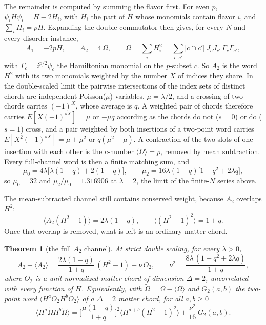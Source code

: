 \documentclass[11pt]{article}
\newtheorem{theorem}{Theorem}
\begin{document}
The remainder is computed by summing the flavor first. For even $p$,
$\psi_iH\psi_i=H-2H_i$, with $H_i$ the part of $H$ whose monomials
contain flavor $i$, and $\sum_iH_i=pH$. Expanding the double commutator
then gives, for every $N$ and every disorder instance,
\begin{equation}
A_1=-2pH,\qquad A_2=4\,\Omega,\qquad \Omega=\sum_iH_i^2
=\sum_{c,c'}|c\cap c'|\,J_cJ_{c'}\,\Gamma_c\Gamma_{c'},
\label{eq:A2}
\end{equation}
with $\Gamma_c=i^{p/2}\psi_{c}$ the Hamiltonian monomial on the $p$-subset
$c$. So $A_2$ is the word $H^2$ with its two monomials weighted by the
number $X$ of indices they share. In the double-scaled limit the
pairwise intersections of the index sets of distinct chords are
independent Poisson($\mu$) variables, $\mu=\lambda/2$, and a crossing of
two chords carries $(-1)^X$, whose average is $q$. A weighted pair of
chords therefore carries $E[X(-1)^{sX}]=\mu$ or $-\mu q$ according as
the chords do not ($s=0$) or do ($s=1$) cross, and a pair weighted by
both insertions of a two-point word carries $E[X^2(-1)^{sX}]=\mu+\mu^2$
or $q(\mu^2-\mu)$. A contraction of the two slots of one insertion with
each other is the $c$-number $\langle\Omega\rangle=p$, removed by mean
subtraction. Every full-channel word is then a finite matching sum, and
\begin{equation}
\mu_0=4\lambda\big[\lambda(1+q)+2(1-q)\big],\qquad
\mu_2=16\lambda(1-q)\big[1-q^2+2\lambda q\big],
\end{equation}
so $\mu_0=32$ and $\mu_2/\mu_0=1.316906$ at $\lambda=2$, the limit of
the finite-$N$ series above.

The mean-subtracted channel still contains conserved weight, because
$A_2$ overlaps $H^2$:
\begin{equation}
\langle A_2(H^2-1)\rangle=2\lambda(1-q),\qquad
\langle(H^2-1)^2\rangle=1+q .
\end{equation}
Once that overlap is removed, what is left is an ordinary matter chord.

\begin{theorem}[the full $A_2$ channel]
At strict double scaling, for every $\lambda>0$,
\begin{equation}
A_2-\langle A_2\rangle=\frac{2\lambda(1-q)}{1+q}\,(H^2-1)+\nu\,O_2,
\qquad
\nu^2=\frac{8\lambda\,(1-q^2+2\lambda q)}{1+q},
\label{eq:split}
\end{equation}
where $O_2$ is a unit-normalized matter chord of dimension $\Delta=2$,
uncorrelated with every function of $H$. Equivalently, with
$\tilde\Omega=\Omega-\langle\Omega\rangle$ and $G_2(a,b)$ the two-point
word $\langle H^aO_2H^bO_2\rangle$ of a $\Delta=2$ matter chord, for all
$a,b\ge0$
\begin{equation}
\langle H^a\tilde\Omega H^b\tilde\Omega\rangle
=\Big[\frac{\mu(1-q)}{1+q}\Big]^2\big\langle H^{a+b}(H^2-1)^2\big\rangle
+\frac{\nu^2}{16}\,G_2(a,b).
\label{eq:words}
\end{equation}
\end{theorem}
\end{document}
